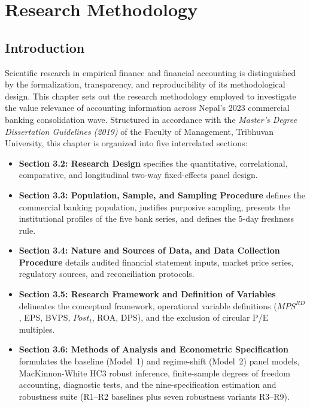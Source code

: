 \chapter{Research Methodology}

\section{Introduction}
Scientific research in empirical finance and financial accounting is distinguished by the formalization, transparency, and reproducibility of its methodological design. This chapter sets out the research methodology employed to investigate the value relevance of accounting information across Nepal's 2023 commercial banking consolidation wave. Structured in accordance with the \textit{Master's Degree Dissertation Guidelines (2019)} of the Faculty of Management, Tribhuvan University, this chapter is organized into five interrelated sections:
\begin{itemize}
    \item \textbf{Section 3.2: Research Design} specifies the quantitative, correlational, comparative, and longitudinal two-way fixed-effects panel design.
    \item \textbf{Section 3.3: Population, Sample, and Sampling Procedure} defines the commercial banking population, justifies purposive sampling, presents the institutional profiles of the five bank series, and defines the 5-day freshness rule.
    \item \textbf{Section 3.4: Nature and Sources of Data, and Data Collection Procedure} details audited financial statement inputs, market price series, regulatory sources, and reconciliation protocols.
    \item \textbf{Section 3.5: Research Framework and Definition of Variables} delineates the conceptual framework, operational variable definitions ($\mathit{MPS}^{RD}$, EPS, BVPS, $\mathit{Post}_t$, ROA, DPS), and the exclusion of circular P/E multiples.
    \item \textbf{Section 3.6: Methods of Analysis and Econometric Specification} formulates the baseline (Model~1) and regime-shift (Model~2) panel models, MacKinnon-White HC3 robust inference, finite-sample degrees of freedom accounting, diagnostic tests, and the nine-specification estimation and robustness suite (R1--R2 baselines plus seven robustness variants R3--R9).
\end{itemize}

